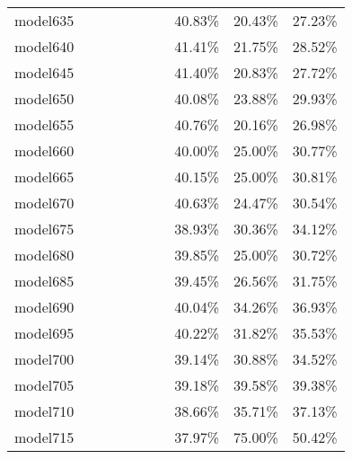 \begin{longtable}{@{}llllllllll@{}}
model635 &         &         &         &          &         &         & 40.83\%  & 20.43\% & 27.23\% \\
model640 &         &         &         &          &         &         & 41.41\%  & 21.75\% & 28.52\% \\
model645 &         &         &         &          &         &         & 41.40\%  & 20.83\% & 27.72\% \\
model650 &         &         &         &          &         &         & 40.08\%  & 23.88\% & 29.93\% \\
model655 &         &         &         &          &         &         & 40.76\%  & 20.16\% & 26.98\% \\
model660 &         &         &         &          &         &         & 40.00\%  & 25.00\% & 30.77\% \\
model665 &         &         &         &          &         &         & 40.15\%  & 25.00\% & 30.81\% \\
model670 &         &         &         &          &         &         & 40.63\%  & 24.47\% & 30.54\% \\
model675 &         &         &         &          &         &         & 38.93\%  & 30.36\% & 34.12\% \\
model680 &         &         &         &          &         &         & 39.85\%  & 25.00\% & 30.72\% \\
model685 &         &         &         &          &         &         & 39.45\%  & 26.56\% & 31.75\% \\
model690 &         &         &         &          &         &         & 40.04\%  & 34.26\% & 36.93\% \\
model695 &         &         &         &          &         &         & 40.22\%  & 31.82\% & 35.53\% \\
model700 &         &         &         &          &         &         & 39.14\%  & 30.88\% & 34.52\% \\
model705 &         &         &         &          &         &         & 39.18\%  & 39.58\% & 39.38\% \\
model710 &         &         &         &          &         &         & 38.66\%  & 35.71\% & 37.13\% \\
model715 &         &         &         &          &         &         & 37.97\%  & 75.00\% & 50.42\% \\* \bottomrule
\end{longtable}

\newpage
